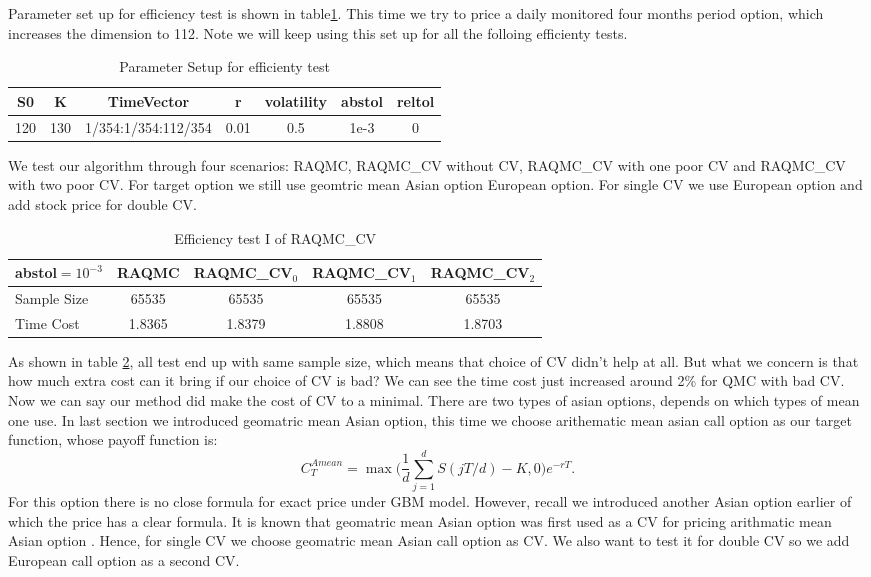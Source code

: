 Parameter set up for efficiency test is shown in table\ref{tb:effsetup}. This time we try to price a daily monitored four months period option, which increases the dimension to 112. Note we will keep using this set up for all the folloing efficienty tests. 
\begin{table}[h]
    \centering
    \label{tb:effsetup}
	\caption{Parameter Setup for efficienty test}
	\begin{tabular}{ccccccc}
		\hline\hline
        S0 & K & TimeVector & r & volatility & abstol & reltol \\[0.5ex]
        \hline
        120  & 130 & 1/354:1/354:112/354 & 0.01 & 0.5 & 1e-3 & 0\\[1ex] 
        \hline
	\end{tabular}
\end{table}
We test our algorithm through four scenarios: RAQMC, RAQMC\_CV without CV, RAQMC\_CV with one poor CV and RAQMC\_CV with two poor CV. 
For target option we still use geomtric mean Asian option European option. For single CV we use European option and add stock price for double CV. 
\begin{table}[h]
    \centering
    \label{tb:efftest1}
	\caption{Efficiency test I of RAQMC\_CV}
    \begin{tabular}{lcccc}  
    \hline\hline
    \hline
    abstol$=10^{-3}$&RAQMC&RAQMC\_CV$_0$&RAQMC\_CV$_1$& RAQMC\_CV$_2$\\[0.5ex]
    \hline
    Sample Size	&65535&65535&65535&65535\\[1ex]
    Time Cost &1.8365&1.8379 &1.8808 &1.8703\\[1ex]
   \hline
	\end{tabular}
\end{table}
As shown in table \ref{tb:efftest1}, all test end up with same sample size, which means that choice of CV didn't help at all. 
But what we concern is that how much extra cost can it bring if our choice of CV is bad? We can see the time cost just increased around 2\% for QMC with bad CV. Now we can say our method did make the cost of CV to a minimal.  
There are two types of asian options, depends on which types of mean one use. 
In last section we introduced geomatric mean Asian option, this time we choose arithematic mean asian call option as our target function, whose payoff function is:
\[ C_{T}^{Amean} = \max\Big(\frac{1}{d}\sum_{j=1}^{d}S(jT/d)-K, 0\Big)e^{-rT}.\]
For this option there is no close formula for exact price under GBM model.
However, recall we introduced another Asian option earlier of which the price has a clear formula. 
It is known that geomatric mean Asian option was first used as a CV for pricing arithmatic mean Asian option \cite{kemna1990pricing}. 
Hence, for single CV we choose geomatric mean Asian call option as CV. 
We also want to test it for double CV so we add European call option as a second CV. 

